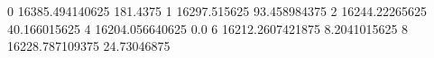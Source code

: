0 16385.494140625 181.4375
1 16297.515625 93.458984375
2 16244.22265625 40.166015625
4 16204.056640625 0.0
6 16212.2607421875 8.2041015625
8 16228.787109375 24.73046875
